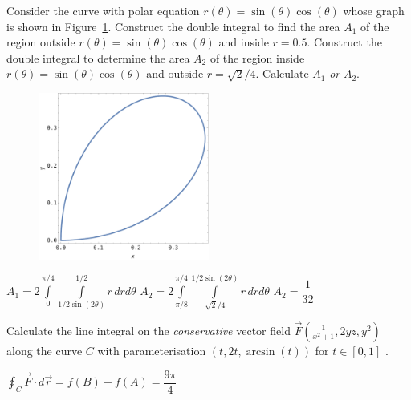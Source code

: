 \begin{Exercise} %
Consider the curve with polar equation $r(\theta)=\sin(\theta)\cos(\theta)$ whose graph is shown in Figure~\ref{Rose}.
\Question Construct the double integral to find the area $A_1$ of the region outside $r(\theta)=\sin(\theta)\cos(\theta)$ and inside $r=0.5$.
\Question Construct the double integral to determine the area $A_2$ of the region inside $r(\theta)=\sin(\theta)\cos(\theta)$ and outside $r=\sqrt{2}/4$. 
\Question Calculate $A_1$ \textit{or} $A_2$.
\EndCurrentQuestion
\begin{figure}[H]
\centering
\includegraphics[width=0.5\textwidth]{Rose}
\caption{\label{Rose}}
\end{figure}
\end{Exercise} 

\begin{Answer}
\Question $A_1 = 2 \displaystyle \int \limits_0^{\pi/4} \int \limits_{1/2 \sin(2 \theta)}^{1/2} r \, dr d \theta$
\Question $A_2 = 2 \displaystyle \int \limits_{\pi/8}^{\pi/4} \int \limits_{\sqrt{2}/4}^{1/2 \sin(2 \theta)} r \, dr d \theta$
\Question $A_2 = \dfrac{1}{32}$

\end{Answer}

\begin{Exercise} %
Calculate the line integral on the \textit{conservative} vector field $\vec{F}\left(\frac{1}{x^2+1},2yz,y^2\right)$ along the curve $C$ with parameterisation $(t,2t,\arcsin(t))$ for $t\in[0,1]$ .
\end{Exercise} 

\begin{Answer}\phantom{}
$\displaystyle \oint_C \vec{F} \cdot d\vec{r} = f(B) - f(A) = \dfrac{9 \pi}{4}$
\end{Answer}


